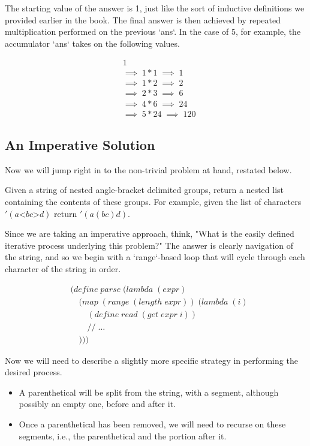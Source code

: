 The starting value of the answer is 1, just like the sort of inductive definitions we 
provided earlier in the book. The final answer is then achieved by repeated 
multiplication performed on the previous `ans`. In the case of 5, for example, the 
accumulator `ans` takes on the following values.

\begin{align*}
& 1
\\& \implies \; 1*1 \; \implies \; 1
\\& \implies \; 1*2 \; \implies \; 2
\\& \implies \; 2*3 \; \implies \; 6
\\& \implies \; 4*6 \; \implies \; 24
\\& \implies \; 5*24 \; \implies \; 120
\end{align*}

\subsection{An Imperative Solution}
Now we will jump right in to the non-trivial problem at hand, restated below.

Given a string of nested angle-bracket delimited groups, return a
nested list containing the contents of these groups. For example,
given the list of characters $'(a \text{<} b c \text{>} d)$ return $'(a (b c) d)$.

Since we are taking an imperative approach, think, "What is the easily defined iterative 
process underlying this problem?" The answer is clearly navigation of the string, and so 
we begin with a `range`-based loop that will cycle through each character of the string 
in order.

\begin{align*}
& (define \; parse \; (lambda \; (expr) \; 
\\& \quad (map \; (range \; (length \; expr)) \; (lambda \; (i)
\\& \qquad (define \; read \; (get \; expr \; i))
\\& \qquad // \; \dots
\\& \quad )))
\end{align*}

Now we will need to describe a slightly more specific strategy in performing the desired 
process.

\begin{itemize}
  \item A parenthetical will be split from the string, with a segment, although possibly an empty one, before and after it.
  \item Once a parenthetical has been removed, we will need to recurse on these segments, i.e., the parenthetical and the portion after it.
\end{itemize}

